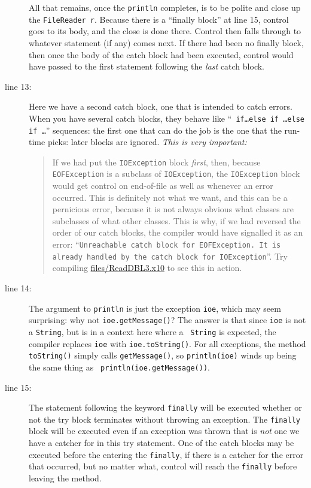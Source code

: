\begin{description}
All that remains, once the {\tt println} completes, is to be polite and
close up the {\tt FileReader r}.  Because there is a ``finally block'' at line
15, control goes to its body, and the close is done there.  Control then falls
through to whatever statement (if any) comes next.  If there had been no finally block,
then once the body of the catch block had been executed, control would have
passed to the first statement following the {\em last} catch block.
\item[line 13:] Here we have a second catch block, one that is intended to
catch errors.  When you have several catch blocks, they behave like ``{\tt
if\ldots else if \ldots else if \ldots}'' sequences: the first one that can do
the job is the one that the run-time picks: later blocks are ignored.  {\em
This is very important:}
\begin{quote}
If we had put the {\tt IOException} block {\em first}, then, because {\tt
EOF\-Ex\-cep\-tion} is a subclass of {\tt IO\-Ex\-cep\-tion}, the
{\tt IOException} block would
get control on end-of-file as well as whenever an error occurred.  This is
definitely not what we want, and this can be a pernicious error, because it is
not always obvious what classes are subclasses of what other classes.  This
is why, if we had reversed the order of our catch blocks, the compiler
would have signalled it as an error: ``{\tt Unreachable catch block for
EOFException. It is already handled by the catch block for IOException}''.  Try
compiling 
\href{http://dist.codehaus.org/x10/documentation/guide/src/files/ReadDBL3.x10}{files/ReadDBL3.x10}
to see this in action.
\end{quote}
\item[line 14: ] The argument to {\tt println} is just the exception {\tt ioe},
which may seem surprising: why not {\tt ioe.getMessage()}?  The answer is that
since {\tt ioe} is not a {\tt String}, but is in a context here where a {\tt
String} is expected, the compiler replaces {\tt ioe} with {\tt ioe.toString()}. 
For all exceptions, the method {\tt toString()} simply calls {\tt getMessage()},
so {\tt println(ioe)} winds up being the same thing as {\tt
println(ioe.getMessage())}.
\item[line 15: ] The statement following the keyword {\tt finally} will be
executed whether or not the try block terminates without throwing an exception.
The {\tt finally} block will be executed even if an exception was thrown that is
{\em not} one we have a catcher for in this try statement. One of the catch
blocks may be executed before the entering the {\tt finally}, if there is a
catcher for the error that occurred, but no matter what, control will
reach the {\tt finally} before leaving the method.


\end{description}
